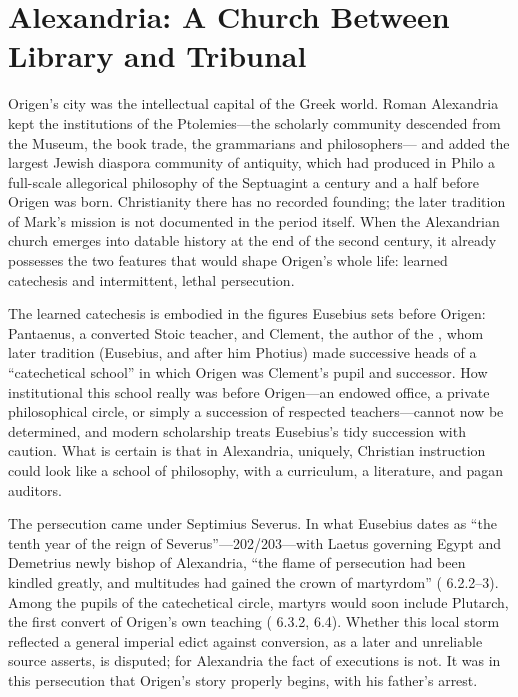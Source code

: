 \section{Alexandria: A Church Between Library and Tribunal}

Origen's city was the intellectual capital of the Greek world. Roman
Alexandria kept the institutions of the Ptolemies---the scholarly community
descended from the Museum, the book trade, the grammarians and philosophers---
and added the largest Jewish diaspora community of antiquity, which had
produced in Philo a full-scale allegorical philosophy of the Septuagint a
century and a half before Origen was born. Christianity there has no recorded
founding; the later tradition of Mark's mission is not documented in the
period itself. When the Alexandrian church emerges into datable history at
the end of the second century, it already possesses the two features that
would shape Origen's whole life: learned catechesis and intermittent, lethal
persecution.

The learned catechesis is embodied in the figures Eusebius sets before
Origen: Pantaenus, a converted Stoic teacher, and Clement, the author of the
, whom later tradition (Eusebius, and after him Photius)
made successive heads of a ``catechetical school'' in which Origen was
Clement's pupil and successor. How institutional this school really was
before Origen---an endowed office, a private philosophical circle, or simply
a succession of respected teachers---cannot now be determined, and modern
scholarship treats Eusebius's tidy succession with caution. What is certain
is that in Alexandria, uniquely, Christian instruction could look like a
school of philosophy, with a curriculum, a literature, and pagan auditors.


The persecution came under Septimius Severus. In what Eusebius dates as ``the
tenth year of the reign of Severus''---202/203---with Laetus governing Egypt
and Demetrius newly bishop of Alexandria, ``the flame of persecution had been
kindled greatly, and multitudes had gained the crown of martyrdom''
( 6.2.2--3). Among the pupils of the catechetical
circle, martyrs would soon include Plutarch, the first convert of Origen's
own teaching ( 6.3.2, 6.4). Whether this local storm
reflected a general imperial edict against conversion, as a later and
unreliable source asserts, is disputed; for Alexandria the fact of executions
is not. It was in this persecution that Origen's story properly begins, with
his father's arrest.
